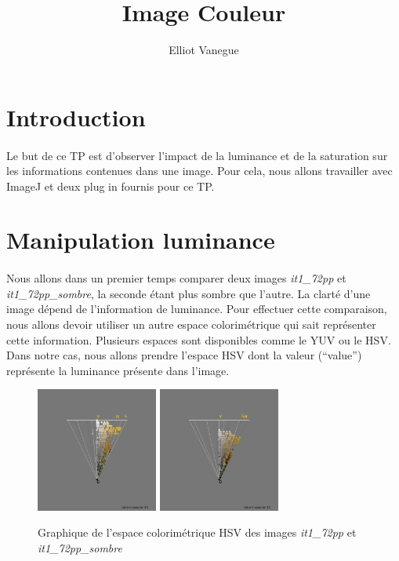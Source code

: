 \documentclass[a4paper,10pt]{article}
\title{Image Couleur}
\author{Elliot Vanegue}
\begin{document}
\maketitle
\section{Introduction}
\paragraph{}Le but de ce TP est d'observer l'impact de la luminance et de la saturation sur les informations contenues dans une image. Pour cela, nous allons travailler avec ImageJ et deux plug in fournis pour ce TP.

\section{Manipulation luminance}
\paragraph{}Nous allons dans un premier temps comparer deux images \textit{it1\_72pp} et \textit{it1\_72pp\_sombre}, la seconde étant plus sombre que l'autre.
La clarté d'une image dépend de l'information de luminance.
Pour effectuer cette comparaison, nous allons devoir utiliser un autre espace colorimétrique qui
sait représenter cette information. Plusieurs espaces sont disponibles comme le YUV ou le HSV.
Dans notre cas, nous allons prendre l'espace HSV dont la valeur (\enquote{value}) représente 
la luminance présente dans l'image.\\

\begin{figure}[!h]
 \begin{center}
 \includegraphics[width=4cm]{resultat/luminance1.png}
 \includegraphics[width=4cm]{resultat/luminance2.png}
 \caption{Graphique de l'espace colorimétrique HSV des images \textit{it1\_72pp} et \textit{it1\_72pp\_sombre}}
 \end{center}
\end{figure}
\end{document}
